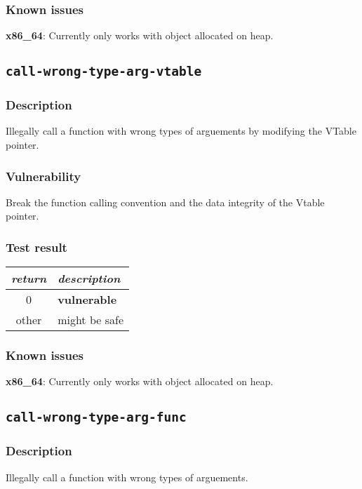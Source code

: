 \documentclass[a4paper]{book}
\begin{document}
\subsubsection{Known issues}
\textbf{x86\_64}: Currently only works with object allocated on heap.

\newpage
\subsection{\texttt{call-wrong-type-arg-vtable}}\label{test-call-wrong-type-arg-vtable}

\subsubsection{Description}
Illegally call a function with wrong types of arguements by modifying the VTable pointer.

\subsubsection{Vulnerability}
Break the function calling convention and the data integrity of the Vtable pointer.

\subsubsection{Test result}
\begin{tabular}{cl}
  \toprule
  \emph{return}  & \emph{description} \\
  \midrule
  0              & \textbf{vulnerable} \\
  other          & might be safe \\
  \bottomrule
\end{tabular}

\subsubsection{Known issues}
\textbf{x86\_64}: Currently only works with object allocated on heap.

\newpage

\subsection{\texttt{call-wrong-type-arg-func}}\label{test-call-wrong-type-arg-func}

\subsubsection{Description}
Illegally call a function with wrong types of arguements.
\end{document}
